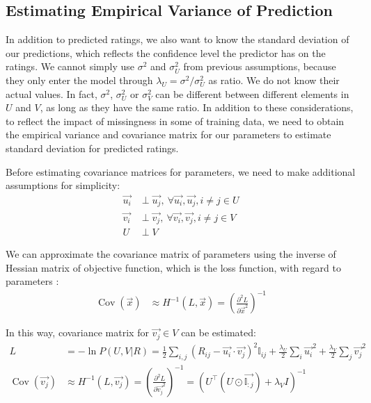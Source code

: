 \documentclass{article}
\begin{document}
\subsection{Estimating Empirical Variance of Prediction}
In addition to predicted ratings, we also want to know the standard deviation of our predictions, which reflects the confidence level the predictor has on the ratings. We cannot simply use $\sigma^2$ and $\sigma_U^2$ from previous assumptions, because they only enter the model through $\lambda_U = \sigma^2 / \sigma_U^2$ as ratio. We do not know their actual values. In fact, $\sigma^2$, $\sigma_U^2$ or $\sigma_V^2$ can be different between different elements in $U$ and $V$, as long as they have the same ratio. In addition to these considerations, to reflect the impact of missingness in some of training data, we need to obtain the empirical variance and covariance matrix for our parameters to estimate standard deviation for predicted ratings.

Before estimating covariance matrices for parameters, we need to make additional assumptions for simplicity:
\begin{align}
    \vec{u_i} & \perp \vec{u_j},\: \forall \vec{u_i}, \vec{u_j}, i \ne j \in U \\
    \vec{v_i} & \perp \vec{v_j},\: \forall \vec{v_i}, \vec{v_j}, i \ne j \in V \\
    U         & \perp V
\end{align}

We can approximate the covariance matrix of parameters using the inverse of Hessian matrix of objective function, which is the loss function, with regard to parameters \cite{baker2021}:
\begin{align}
    \operatorname{Cov}(\vec{x}) & \approx H^{-1}(L, \vec{x}) = \left(\frac{\partial^2 L}{\partial \vec{x}^2}\right)^{-1}
\end{align}

In this way, covariance matrix for $\vec{v_j} \in V$ can be estimated:
\begin{align}
    L                             & = -\ln{P(U, V | R)} = \frac{1}{2} \sum_{i,j} (R_{ij} - \vec{u_i} \cdot \vec{v_j})^2 \mathbb{I}_{ij} + \frac{\lambda_U}{2} \sum_i \vec{u_i}^2 + \frac{\lambda_V}{2} \sum_j \vec{v_j}^2 \\
    \operatorname{Cov}(\vec{v_j}) & \approx H^{-1}(L, \vec{v_j}) = \left(\frac{\partial^2 L}{\partial \vec{v_j}^2}\right)^{-1} = \left(U^\top (U \odot \vec{\mathbb{I}_{:j}}) + \lambda_V I\right)^{-1}
\end{align}
\end{document}
